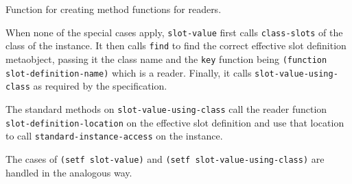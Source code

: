 \begin{codefragment}
\caption{\label{code-make-reader}
Function for creating method functions for readers.}
\end{codefragment}

When none of the special cases apply, \texttt{slot-value} first calls
\texttt{class-slots} of the class of the instance.  It then calls
\texttt{find} to find the correct effective slot definition
metaobject, passing it the class name and the \texttt{key} function
being \texttt{(function slot-definition-name)} which is a reader.
Finally, it calls \texttt{slot-value-using-class} as required by the
specification.

The standard methods on \texttt{slot-value-using-class} call the
reader function \texttt{slot-definition-location} on the effective
slot definition and use that location to call
\texttt{standard-instance-access} on the instance.

The cases of \texttt{(setf slot-value)} and \texttt{(setf
  slot-value-using-class)} are handled in the analogous way.
